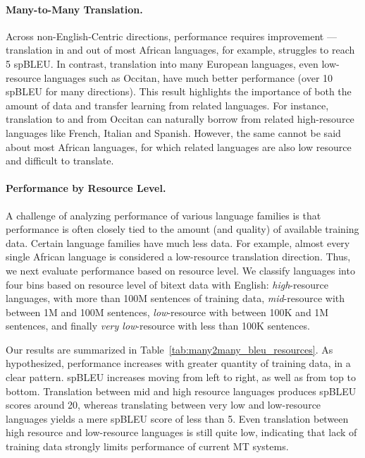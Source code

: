 \paragraph{Many-to-Many Translation.} Across non-English-Centric directions, performance requires improvement --- translation in and out of most African languages, for example, struggles to reach 5 spBLEU. In contrast, translation into many European languages, even low-resource languages such as Occitan, have much better performance (over 10 spBLEU for many directions). This result highlights the importance of both the amount of data and transfer learning from related languages. For instance, translation to and from Occitan can naturally borrow from related high-resource languages like French, Italian and Spanish. However, the same cannot be said about most African languages, for which related languages are also low resource and difficult to translate.

\paragraph{Performance by Resource Level.}

A challenge of analyzing performance of various language families is that performance is often closely tied to the amount (and quality) of available training data. Certain language families have much less data. For example, almost every single African language is considered a low-resource translation direction. Thus, we next evaluate performance based on resource level. We classify languages into four bins based on resource level of bitext data with English: \textit{high}-resource languages, with more than 100M sentences of training data, \textit{mid}-resource with between 1M and 100M sentences, \textit{low}-resource with between 100K and 1M sentences, and finally \textit{very low}-resource with less than 100K sentences.

Our results are summarized in Table~\ref{tab:many2many_bleu_resources}. 
As hypothesized, performance increases with greater quantity of training data, in a clear pattern. spBLEU increases moving from left to right, as well as from top to bottom. Translation between mid and high resource languages produces spBLEU scores around 20, whereas translating between very low and low-resource languages yields a mere spBLEU score of less than 5. Even translation between high resource and low-resource languages is still quite low, indicating that lack of training data strongly limits performance of current MT systems. 

